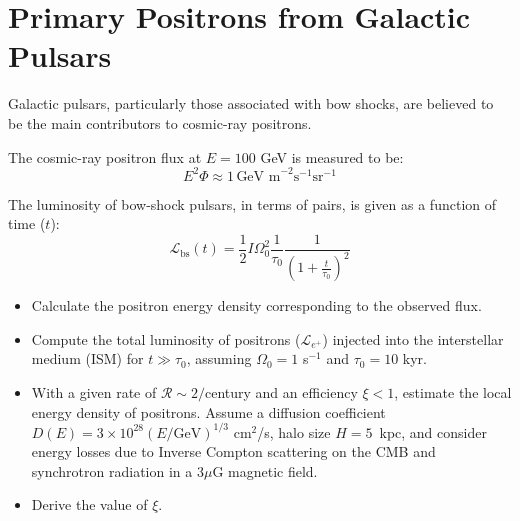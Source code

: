 \section{Primary Positrons from Galactic Pulsars}

Galactic pulsars, particularly those associated with bow shocks, are believed to be the main contributors to cosmic-ray positrons. 

The cosmic-ray positron flux at \(E = 100\) GeV is measured to be:
%
\[E^2 \Phi \approx 1 \, \text{GeV m}^{-2} \text{s}^{-1} \text{sr}^{-1}\]

The luminosity of bow-shock pulsars, in terms of pairs, is given as a function of time (\(t\)):
%
\[\mathcal{L}_{\text{bs}}(t) = \frac{1}{2} I \Omega_0^2 \frac{1}{\tau_0} \frac{1}{\left(1+\frac{t}{\tau_0}\right)^2}\]

\begin{itemize}
\item Calculate the positron energy density corresponding to the observed flux. 
\item Compute the total luminosity of positrons (\(\mathcal{L}_{e^+}\)) injected into the interstellar medium (ISM) for \(t \gg \tau_0\), assuming \(\Omega_0 = 1\) s\(^{-1}\) and \(\tau_0 = 10\) kyr. 
\item With a given rate of \(\mathcal{R} \sim 2/\)century and an efficiency \(\xi < 1\), estimate the local energy density of positrons. Assume a diffusion coefficient \(D(E) = 3 \times 10^{28} (E/\text{GeV})^{1/3}\) cm\(^2\)/s, halo size \( H = 5 \)~kpc, and consider energy losses due to Inverse Compton scattering on the CMB and synchrotron radiation in a \(3 \mu\)G magnetic field.
\item Derive the value of \(\xi\).
\end{itemize}

